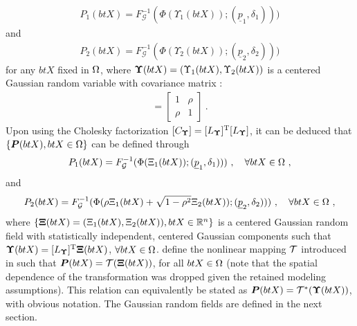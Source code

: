 \begin{align}
  P_1(btX) = F_\mathcal{G}^{-1}(\Phi(\Upsilon_1(btX)); (\underline{p}_1,\delta_{1})))
\end{align}
and
\begin{align}
  P_2(btX) = F_\mathcal{G}^{-1}(\Phi(\Upsilon_2(btX)); (\underline{p}_2,\delta_{2})))
\end{align}
for any $btX$ fixed in $\Omega$, where $\boldsymbol{\Upsilon}(btX) = (\Upsilon_1(btX),\Upsilon_2(btX))$ is a centered Gaussian random variable with covariance matrix \cite{Moran1969}:
\begin{align}
  [C_{\bs{\Upsilon}}] =
  \begin{bmatrix}
    1    & \rho \\
    \rho & 1    
  \end{bmatrix}~.
\end{align}
Upon using the Cholesky factorization $[C_{\boldsymbol{\Upsilon}}] = [L_{\boldsymbol{\Upsilon}}]^\mathrm{T} [L_{\boldsymbol{\Upsilon}}]$, it can be deduced that $\{\boldsymbol{P}(btX), btX \in \Omega\}$ can be defined through
\begin{align}\label{eq: def-P1}
  P_1(btX) = F_\mathcal{G}^{-1}(\Phi(\Xi_1(btX)); (\underline{p}_1,\delta_{1})))~, \quad \forall btX \in \Omega~,
\end{align}
and
\begin{align}\label{eq: def-P2}
  P_2(btX) = F_\mathcal{G}^{-1}(\Phi(\rho \Xi_1(btX) + \sqrt{1-\rho^2} \Xi_2(btX)); (\underline{p}_2,\delta_{2})))~,\quad \forall btX \in \Omega~,
\end{align}
where $\{\boldsymbol{\Xi}(btX)=(\Xi_1(btX),\Xi_2(btX)), btX \in \mathbb{R}^n\}$ is a centered Gaussian random field with statistically independent, centered Gaussian components such that $\boldsymbol{\Upsilon}(btX) = [L_{\boldsymbol{\Upsilon}}]^\mathrm{T}\boldsymbol{\Xi}(btX)$,
$\forall btX \in \Omega$.  define the nonlinear mapping $\mathcal{T}$ introduced in  such that $\boldsymbol{P}(btX) = \mathcal{T}(\boldsymbol{\Xi}(btX))$,
for all $btX \in \Omega$ (note that the spatial dependence of the transformation was dropped given the retained modeling assumptions). This relation can equivalently be stated as $\boldsymbol{P}(btX) = \mathcal{T}^\ast(\boldsymbol{\Upsilon}(btX))$, with obvious notation. The Gaussian random fields are defined in the next section.

